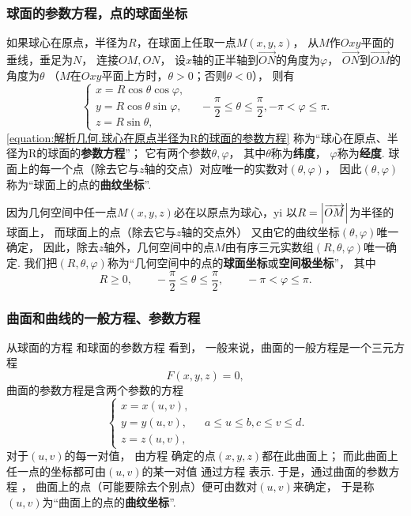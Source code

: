 \subsubsection{球面的参数方程，点的球面坐标}
如果球心在原点，半径为\(R\)，在球面上任取一点\(M(x,y,z)\)，
从\(M\)作\(Oxy\)平面的垂线，垂足为\(N\)，
连接\(OM,ON\)，
设\(x\)轴的正半轴到\(\vec{ON}\)的角度为\(\varphi\)，
\(\vec{ON}\)到\(\vec{OM}\)的角度为\(\theta\)
（\(M\)在\(Oxy\)平面上方时，\(\theta>0\)；否则\(\theta<0\)），
则有
\begin{equation}\label{equation:解析几何.球心在原点半径为R的球面的参数方程}
	\left\{ \begin{array}{l}
		x = R \cos\theta \cos\varphi, \\
		y = R \cos\theta \sin\varphi, \\
		z = R \sin\theta,
	\end{array} \right.
	\quad
	-\frac{\pi}{2} \leqslant \theta \leqslant \frac{\pi}{2},
	-\pi < \varphi \leqslant \pi.
\end{equation}
\cref{equation:解析几何.球心在原点半径为R的球面的参数方程}
称为“球心在原点、半径为R的球面的\textbf{参数方程}”；
它有两个参数\(\theta,\varphi\)，
其中\(\theta\)称为\textbf{纬度}，
\(\varphi\)称为\textbf{经度}.
球面上的每一个点（除去它与\(z\)轴的交点）对应唯一的实数对\((\theta,\varphi)\)，
因此\((\theta,\varphi)\)称为“球面上的点的\textbf{曲纹坐标}”.

因为几何空间中任一点\(M(x,y,z)\)必在以原点为球心，yi
以\(R=\abs{\overrightarrow{OM}}\)为半径的球面上，
而球面上的点（除去它与\(z\)轴的交点外）
又由它的曲纹坐标\((\theta,\varphi)\)唯一确定，
因此，除去\(z\)轴外，几何空间中的点\(M\)由有序三元实数组\((R,\theta,\varphi)\)唯一确定.
我们把\((R,\theta,\varphi)\)称为“几何空间中的点的\textbf{球面坐标}或\textbf{空间极坐标}”，
其中\[
	R \geqslant 0,
	\qquad
	-\frac{\pi}{2} \leqslant \theta \leqslant \frac{\pi}{2},
	\qquad
	-\pi < \varphi \leqslant \pi.
\]

\subsubsection{曲面和曲线的一般方程、参数方程}
从球面的方程 
和球面的参数方程  看到，
一般来说，曲面的一般方程是一个三元方程\[
	F(x,y,z) = 0,
\]
曲面的参数方程是含两个参数的方程
\begin{equation}\label{equation:解析几何.曲面的参数方程}
	\left\{ \begin{array}{l}
		x = x(u,v), \\
		y = y(u,v), \\
		z = z(u,v),
	\end{array} \right.
	\quad
	a \leqslant u \leqslant b,
	c \leqslant v \leqslant d.
\end{equation}
对于\((u,v)\)的每一对值，
由方程  确定的点\((x,y,z)\)都在此曲面上；
而此曲面上任一点的坐标都可由\((u,v)\)的某一对值
通过方程  表示.
于是，通过曲面的参数方程 ，
曲面上的点（可能要除去个别点）便可由数对\((u,v)\)来确定，
于是称\((u,v)\)为“曲面上的点的\textbf{曲纹坐标}”.

